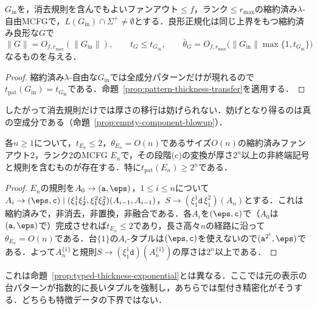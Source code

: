 \begin{proposition}
\label{prop:structural-good-thickness}
$G_{\mathrm{in}}$を，消去規則を含んでもよいファンアウト$\le f$，ランク$\le r_{\max}$の縮約済み$\lambda$-自由MCFGで，$L(G_{\mathrm{in}})\cap\Sigma^+\ne\emptyset$とする．良形正規化は同じ上界をもつ縮約済み良形な$G$で
\[
  \|G\|=O_{f,r_{\max}}(\|G_{\mathrm{in}}\|),\qquad
  t_G\le t_{G_{\mathrm{in}}},\qquad
  \bar\theta_G=O_{f,r_{\max}}\bigl(\|G_{\mathrm{in}}\|\max\{1,t_{G_{\mathrm{in}}}\}\bigr)
\]
なるものを与える．
\end{proposition}

\begin{proof}
縮約済み$\lambda$-自由な$G_{\mathrm{in}}$では全成分パターンだけが現れるので$t_{\mathrm{pat}}(G_{\mathrm{in}})=t_{G_{\mathrm{in}}}$である．命題~\ref{prop:pattern-thickness-transfer}を適用する．
\end{proof}

したがって消去規則だけでは厚さの移行は妨げられない．妨げとなり得るのは真の空成分である（命題~\ref{prop:empty-component-blowup}）．


\begin{proposition}[空成分の除去は厚さを爆発させ得る]
\label{prop:empty-component-blowup}
各$n\ge1$について，$t_{E_n}\le2$，$\theta_{E_n}=O(n)$であるサイズ$O(n)$の縮約済みファンアウト2，ランク2のMCFG $E_n$で，その段階(c)の変換が厚さ$2^n$以上の非終端記号と規則を含むものが存在する．特に$t_{\mathrm{pat}}(E_n)\ge2^n$である．
\end{proposition}

\begin{proof}
$E_n$の規則を$A_0\to(\mathtt a,\eps)$，$1\le i\le n$について$A_i\to(\eps,\mathtt c)\mid(\xi_1^1\xi_2^1,\xi_1^2\xi_2^2)(A_{i-1},A_{i-1})$，$S\to(\xi_1^1\mathtt d\,\xi_1^2)(A_n)$とする．これは縮約済みで，非消去，非置換，非融合である．各$A_i$を$(\eps,\mathtt c)$で（$A_0$は$(\mathtt a,\eps)$で）完成させれば$t_{E_n}\le2$であり，長さ高々$n$の経路に沿って$\theta_{E_n}=O(n)$である．台$\{1\}$の$A_i$-タプルは$(\eps,\mathtt c)$を使えないので$(\mathtt a^{2^i},\eps)$である．よって$A_n^{\{1\}}$と規則$S\to(\xi_1^1\mathtt d)(A_n^{\{1\}})$の厚さは$2^n$以上である．
\end{proof}

これは命題~\ref{prop:typed-thickness-exponential}とは異なる．ここでは元の表示の台パターンが指数的に長いタプルを強制し，あちらでは型付き精密化がそうする．どちらも特徴データの下界ではない．



